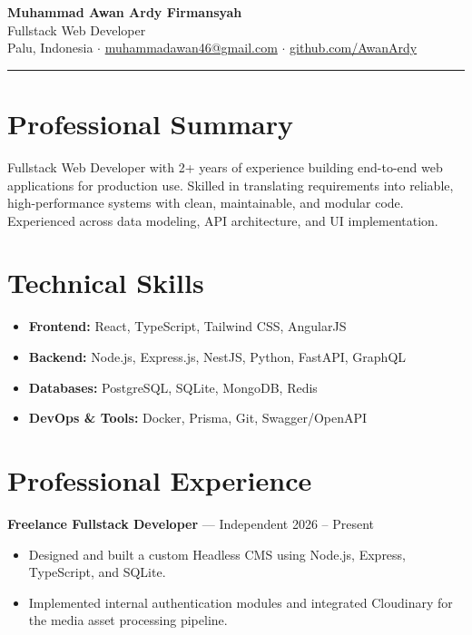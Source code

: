 \documentclass[11pt,a4paper]{article}
\newcommand{\cvheading}[1]{\textbf{#1}}
\begin{document}
\begin{center}
  {\LARGE\bfseries Muhammad Awan Ardy Firmansyah}\\[3pt]
  {\large Fullstack Web Developer}\\[4pt]
  Palu, Indonesia $\cdot$ \href{mailto:muhammadawan46@gmail.com}{muhammadawan46@gmail.com} $\cdot$ \href{https://github.com/AwanArdy}{github.com/AwanArdy}
\end{center}

\vspace{2pt}\hrule

\section*{Professional Summary}
Fullstack Web Developer with 2+ years of experience building end-to-end web applications for production use. Skilled in translating requirements into reliable, high-performance systems with clean, maintainable, and modular code. Experienced across data modeling, API architecture, and UI implementation.

\section*{Technical Skills}
\begin{itemize}[leftmargin=1.2em,itemsep=1pt,topsep=2pt]
  \item \cvheading{Frontend:} React, TypeScript, Tailwind CSS, AngularJS
  \item \cvheading{Backend:} Node.js, Express.js, NestJS, Python, FastAPI, GraphQL
  \item \cvheading{Databases:} PostgreSQL, SQLite, MongoDB, Redis
  \item \cvheading{DevOps \& Tools:} Docker, Prisma, Git, Swagger/OpenAPI
\end{itemize}

\section*{Professional Experience}

\cvheading{Freelance Fullstack Developer} --- Independent \hfill 2026 -- Present
\begin{itemize}[leftmargin=1.2em,itemsep=1pt,topsep=2pt]
  \item Designed and built a custom Headless CMS using Node.js, Express, TypeScript, and SQLite.
  \item Implemented internal authentication modules and integrated Cloudinary for the media asset processing pipeline.
\end{itemize}
\end{document}
